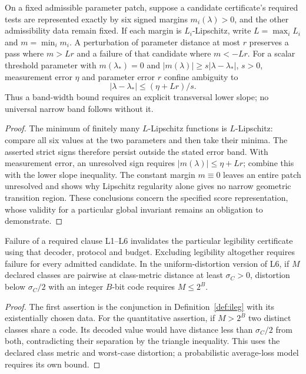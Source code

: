 \begin{proposition}\label{prop:threshold-sensitive-boundary}
On a fixed admissible parameter patch, suppose a candidate certificate's
required tests are represented exactly by six signed margins $m_i(\lambda)>0$,
and the other admissibility data remain fixed. If each margin is
$L_i$-Lipschitz, write $L=\max_iL_i$ and $m=\min_i m_i$.
A perturbation of parameter distance at most $r$ preserves a pass where
$m>Lr$ and a failure of that candidate where $m<-Lr$.
For a scalar threshold parameter with $m(\lambda_*)=0$ and
$|m(\lambda)|\geq s|\lambda-\lambda_*|$, $s>0$, measurement error $\eta$
and parameter error $r$ confine ambiguity to
\[
 |\lambda-\lambda_*|\leq(\eta+Lr)/s.
\]
Thus a band-width bound requires an explicit transversal lower slope;
no universal narrow band follows without it.
\end{proposition}
\begin{proof}
The minimum of finitely many $L$-Lipschitz functions is $L$-Lipschitz:
compare all six values at the two parameters and then take their minima.
The asserted strict signs therefore persist outside the stated error band.
With measurement error, an unresolved sign requires
$|m(\lambda)|\leq\eta+Lr$; combine this with the lower slope inequality.
The constant margin $m\equiv0$ leaves an entire patch unresolved and shows
why Lipschitz regularity alone gives no narrow geometric transition region.
These conclusions concern the specified score representation, whose validity
for a particular global invariant remains an obligation to demonstrate.
\end{proof}

\begin{proposition}\label{prop:legibility-dependence}
Failure of a required clause L1--L6 invalidates the particular legibility
certificate using that decoder, protocol and budget. Excluding legibility
altogether requires failure for every admitted candidate.
In the uniform-distortion version of L6, if $M$ declared classes are pairwise
at class-metric distance at least $\sigma_C>0$, distortion below $\sigma_C/2$
with an integer $B$-bit code requires $M\leq2^B$.
\end{proposition}
\begin{proof}
The first assertion is the conjunction in Definition~\ref{def:ileg} with
its existentially chosen data. For the quantitative assertion, if $M>2^B$
two distinct classes share a code. Its decoded value would have distance
less than $\sigma_C/2$ from both, contradicting their separation by the
triangle inequality. This uses the declared class metric and worst-case
distortion; a probabilistic average-loss model requires its own bound.
\end{proof}

